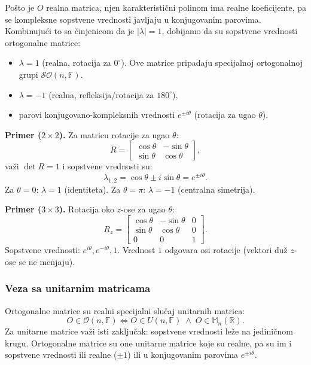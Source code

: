 \documentclass[a4paper,12pt,twoside]{report}
\numberwithin{algorithm}{section}
\begin{document}
Pošto je $O$ realna matrica, njen karakteristični polinom ima realne koeficijente, pa se kompleksne sopstvene vrednosti javljaju u konjugovanim parovima. 
Kombinujući to sa činjenicom da je $|\lambda| = 1$, dobijamo da su sopstvene vrednosti ortogonalne matrice:
\begin{itemize}
    \item $\lambda = 1$ (realna, rotacija za $0^\circ$). Ove matrice pripadaju specijalnoj ortogonalnoj grupi $\mathcal{SO}(n, \mathbb{F})$.
    \item $\lambda = -1$ (realna, refleksija/rotacija za $180^\circ$),
    \item parovi konjugovano-kompleksnih vrednosti $e^{\pm i\theta}$ (rotacija za ugao $\theta$).
\end{itemize}

\medskip
\noindent\textbf{Primer ($2 \times 2$).} 
Za matricu rotacije za ugao $\theta$:
\[
    R = \begin{bmatrix}
        \cos\theta & -\sin\theta \\
        \sin\theta & \cos\theta
    \end{bmatrix},
\]
važi $\det R = 1$ i sopstvene vrednosti su:
\[
    \lambda_{1,2} = \cos\theta \pm i\sin\theta = e^{\pm i\theta}.
\]
Za $\theta = 0$: $\lambda = 1$ (identiteta). 
Za $\theta = \pi$: $\lambda = -1$ (centralna simetrija).

\medskip
\noindent\textbf{Primer ($3 \times 3$).} 
Rotacija oko $z$-ose za ugao $\theta$:
\[
    R_z = \begin{bmatrix}
        \cos\theta & -\sin\theta & 0 \\
        \sin\theta & \cos\theta & 0 \\
        0 & 0 & 1
    \end{bmatrix}.
\]
Sopstvene vrednosti: $e^{i\theta}, e^{-i\theta}, 1$. 
Vrednost $1$ odgovara osi rotacije (vektori duž $z$-ose se ne menjaju).

\subsubsection{Veza sa unitarnim matricama}

Ortogonalne matrice su realni specijalni slučaj unitarnih matrica:
\[
    O \in \mathcal{O}(n, \mathbb{F}) \iff O \in U(n, \mathbb{F}) \;\land\; O \in \mathbb{M}_n(\mathbb{R}).
\]
Za unitarne matrice važi isti zaključak: sopstvene vrednosti leže na jediničnom krugu. 
Ortogonalne matrice su one unitarne matrice koje su realne, pa su im i sopstvene vrednosti ili realne ($\pm 1$) ili u konjugovanim parovima $e^{\pm i\theta}$.
\end{document}
